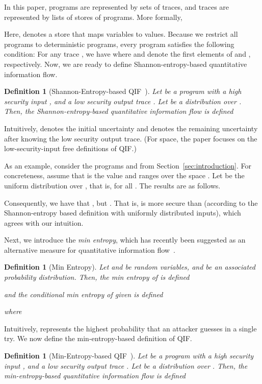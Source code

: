 \documentclass[]{eptcs}
\newtheorem{definition}[theorem]{Definition}
\begin{document}
In this paper, programs are represented by sets of traces, and traces
are represented by lists of stores of programs.  More formally,

Here,  denotes a store that maps variables to values.  Because
we restrict all programs to deterministic programs, every program 
satisfies the following condition: For any trace
, we have
 where
 and  denote the first elements of 
and , respectively.  Now, we are ready to define
Shannon-entropy-based quantitative information
flow.
\begin{definition}[Shannon-Entropy-based
  QIF~\cite{denning82,clarkjcs2007,malacaria:popl2007}]
\label{def:se}
Let  be a program with a high security input , and a low
security output trace .  Let  be a distribution over .
Then, the Shannon-entropy-based quantitative information flow is
defined

\end{definition}
Intuitively,  denotes the initial uncertainty and
 denotes the remaining uncertainty after
knowing the low security output trace.  (For space, the paper focuses
on the low-security-input free definitions of QIF.)  

As an example, consider the programs  and  from
Section~\ref{sec:introduction}.  For concreteness, assume that  is
the value  and  ranges over the space .
Let  be the uniform distribution over , that
is,  for all .  The results are
as follows.

Consequently, we have that ,
but .  That is,  is
more secure than  (according to the Shannon-entropy based
definition with uniformly distributed inputs), which agrees with our
intuition.

Next, we introduce the {\em min entropy}, which has recently been
suggested as an alternative measure for quantitative information
flow~\cite{smith09}.
\begin{definition}[Min Entropy]
Let  and  be random variables, and  be an associated probability
distribution.  Then, the min entropy of  is defined

and the conditional min entropy of  given  is defined

where

\end{definition}

Intuitively,  represents the highest probability
that an attacker guesses  in a single try.  We now define the
min-entropy-based definition of QIF.

\begin{definition}[Min-Entropy-based QIF~\cite{smith09}]
\label{def:me}
Let  be a program with a high security input , and a low
security output trace .  Let  be a distribution over .
Then, the min-entropy-based quantitative information flow is defined

\end{definition}
\end{document}
